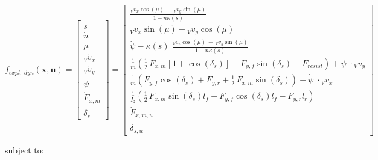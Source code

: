 \documentclass[
a4paper, %
10pt, %
notitlepage,
english]{CSUniSchoolLabReport}
\begin{document}
\begin{equation}
	f_{expl,\;dyn}(\mathbf{x}, \mathbf{u}) =
	\left[\begin{array}{c}

		\dot{s} \\

		\dot{n} \\

		\dot{\mu} \\

		{}_V\dot{v}_x \\

		{}_V\dot{v}_y \\

		\ddot{\psi}\;\;\; \\

		\dot{F}_{x,m} \\

		\dot{\delta}_s

	\end{array}\right] =
	\left[\begin{array}{c}

		\frac{{}_V v_x \cos(\mu) \,-\, {}_V v_y \sin(\mu)}{1 - n \kappa(s)} \\

		{}_V v_x \sin(\mu) + {}_V v_y \cos(\mu) \\

		\dot{\psi} - \kappa(s)\;\frac{{}_V v_x \cos(\mu) \,-\, {}_V v_y \sin(\mu)}{1 - n \kappa(s)} \\

		\frac{1}{m}  \left( \frac{1}{2} \, F_{x, m} \left[1 + \cos(\delta_s)\right] - F_{y, f} \sin(\delta_s) - F_{resist} \right) + \dot{\psi}\;\cdot {}_V v_y \\

		\frac{1}{m}  \left( F_{y, f} \cos(\delta_s) + F_{y, r} + \frac{1}{2} \, F_{x, m} \sin(\delta_s) \right) - \dot{\psi}\;\cdot {}_V v_x \\

		\frac{1}{I_z}  \left( \frac{1}{2} \, F_{x, m} \sin(\delta_s) l_f + F_{y, f} \cos(\delta_s) l_f - F_{y, r} l_r \right) \\

		\dot{F}_{x,m,u} \\

		\dot{\delta}_{s,u}
	\end{array}\right]
\end{equation}

subject to:\\
\end{document}
